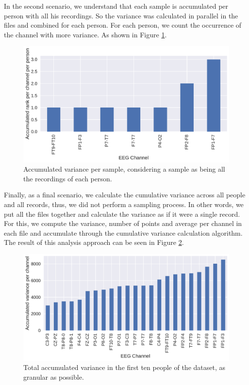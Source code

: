 In the second scenario, we understand that each sample is accumulated per person with all his recordings. So the variance was calculated in parallel in the files and combined for each person. For each person, we count the occurrence of the channel with more variance. As shown in Figure \ref{fig:variance_per_person}.


\begin{figure}[!ht]
  \centering
  \includegraphics[width=\linewidth]{figure/variance_per_person.pdf}
  \caption{Accumulated variance per sample, considering a sample as being all the recordings of each person.}
  \label{fig:variance_per_person}
\end{figure}



Finally, as a final scenario, we calculate the cumulative variance across all people and all records, thus, we did not perform a sampling process. In other words, we put all the files together and calculate the variance as if it were a single record. For this, we compute the variance, number of points and average per channel in each file and accumulate through the cumulative variance calculation algorithm. The result of this analysis approach can be seen in Figure \ref{fig:variance_all_files}.


\begin{figure}[!ht]
  \centering
  \includegraphics[width=\linewidth]{figure/variance_all.pdf}
  \caption{Total accumulated variance in the first ten people of the dataset, as granular as possible.}
\label{fig:variance_all_files}
\end{figure}


